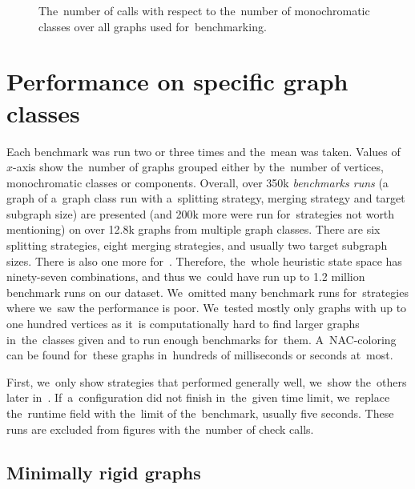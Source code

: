 \begin{figure}[ht]
	\centering
	\scalebox{\BenchFigureScale}{}
	\caption[The number of \IsNACColoring{} calls]{
		The~number of \IsNACColoring{} calls with respect to the~number of monochromatic classes
		over all graphs used for~benchmarking.}%
	\label{fig:graph_summary}
\end{figure}%



\section{Performance on specific graph classes}%
\label{sec:bench_graph_classes}

Each benchmark was run two or three times and the~mean was taken.
Values of \( x \)-axis show the~number of graphs grouped either by the~number of vertices,
monochromatic classes or \trcon{} components.
Overall, over 350k \emph{benchmarks runs}
(a graph of a~graph class run with a~splitting strategy, merging strategy
and target subgraph size)
are presented (and 200k more were run for~strategies not worth mentioning)
on over 12.8k graphs from multiple graph classes.
%
There are six splitting strategies, eight merging strategies, and usually two target subgraph sizes.
There is also one more for~\NaiveCycles{}.
Therefore, the~whole heuristic state space has ninety-seven combinations,
and thus we~could have run up to 1.2 million benchmark runs on our dataset.
We~omitted many benchmark runs for~strategies where we~saw the  performance is poor.
%
We~tested mostly only graphs with up to one hundred vertices
as it~is computationally hard to find larger graphs in~the~classes given
and to run enough benchmarks for~them.
A~NAC-coloring can be found for~these graphs
in~hundreds of milliseconds or seconds at~most.

First, we~only show strategies that performed generally well,
we~show the~others later in~.
If~a~configuration did not finish in~the~given time limit,
we~replace the~runtime field with the~limit of the~benchmark, usually five seconds.
These runs are excluded from figures with the~number of check calls.


\subsection*{Minimally rigid graphs}

